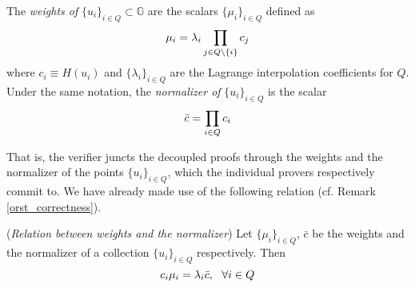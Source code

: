 \documentclass{iacrtrans}
\begin{document}

\begin{defn}\label{orst_weights_definition}
The \textit{weights of}
$\{u_i\}_{i \in Q} \subset \mathbb{G}$
are the scalars
$\{\mu_i\}_{i \in Q}$
defined as
\vspace{+2pt}
\begin{equation}\label{orst_weights}
\mu_i =\lambda_i \prod_{j \in Q \setminus \{i\}} c_j
\vspace{5pt}
\end{equation}
where $c_i \equiv H(u_i)$ and
$\{\lambda_i\}_{i \in Q }$ are the Lagrange interpolation
coefficients for $Q$.
Under the same notation,
the \textit{normalizer of} $\{u_i\}_{i \in Q}$ is the scalar
\vspace{5pt}
\begin{equation}\label{orst_normalizer}
\bar{c} = \prod_{i \in Q} c_i
\vspace{5pt}
\end{equation}
\end{defn}
\noindent
That is, the verifier juncts the decoupled
proofs through the weights and the normalizer
of the points $\{u_i\}_{i \in Q}$,
which the individual provers respectively commit to.
We have already made use of
the following relation
(cf. Remark \ref{orst_correctness}).

\begin{rem}\label{orst_core_remark}
(\textit{Relation between weights and the normalizer})
Let $\{\mu_i\}_{i \in Q}$, $\bar{c}$ be the weights
and the normalizer of a collection $\{u_i\}_{i \in Q}$
respectively. Then
\vspace{5pt}
\begin{equation}\label{orst_core}
c_i \mu_i = \lambda_i \bar{c},\ \ \forall i \in Q
\vspace{5pt}
\end{equation}
\end{rem}
\end{document}
